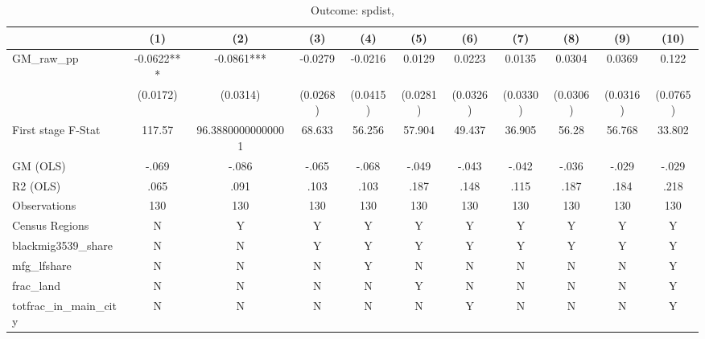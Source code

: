 \begin{table}[htbp]\centering
\def\sym#1{\ifmmode^{#1}\else\(^{#1}\)\fi}
\caption{Outcome: spdist, }
\begin{tabular}{l*{10}{c}}
\toprule
            &\multicolumn{1}{c}{(1)}   &\multicolumn{1}{c}{(2)}   &\multicolumn{1}{c}{(3)}   &\multicolumn{1}{c}{(4)}   &\multicolumn{1}{c}{(5)}   &\multicolumn{1}{c}{(6)}   &\multicolumn{1}{c}{(7)}   &\multicolumn{1}{c}{(8)}   &\multicolumn{1}{c}{(9)}   &\multicolumn{1}{c}{(10)}   \\
\midrule
GM\_raw\_pp   &   -0.0622***&   -0.0861***&   -0.0279   &   -0.0216   &    0.0129   &    0.0223   &    0.0135   &    0.0304   &    0.0369   &     0.122   \\
            &  (0.0172)   &  (0.0314)   &  (0.0268)   &  (0.0415)   &  (0.0281)   &  (0.0326)   &  (0.0330)   &  (0.0306)   &  (0.0316)   &  (0.0765)   \\
\midrule
First stage F-Stat&    117.57   &96.38800000000001   &    68.633   &    56.256   &    57.904   &    49.437   &    36.905   &     56.28   &    56.768   &    33.802   \\
GM (OLS)    &     -.069   &     -.086   &     -.065   &     -.068   &     -.049   &     -.043   &     -.042   &     -.036   &     -.029   &     -.029   \\
R2 (OLS)    &      .065   &      .091   &      .103   &      .103   &      .187   &      .148   &      .115   &      .187   &      .184   &      .218   \\
Observations&       130   &       130   &       130   &       130   &       130   &       130   &       130   &       130   &       130   &       130   \\
Census Regions&         N   &         Y   &         Y   &         Y   &         Y   &         Y   &         Y   &         Y   &         Y   &         Y   \\
blackmig3539\_share&         N   &         N   &         Y   &         Y   &         Y   &         Y   &         Y   &         Y   &         Y   &         Y   \\
mfg\_lfshare &         N   &         N   &         N   &         Y   &         N   &         N   &         N   &         N   &         N   &         Y   \\
frac\_land   &         N   &         N   &         N   &         N   &         Y   &         N   &         N   &         N   &         N   &         Y   \\
totfrac\_in\_main\_city&         N   &         N   &         N   &         N   &         N   &         Y   &         N   &         N   &         N   &         Y   \\

\end{tabular}
\end{table}
